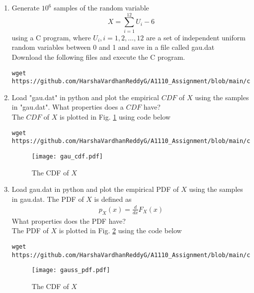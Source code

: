 \documentclass[journal,12pt,twocolumn]{IEEEtran}
\renewcommand\thesection{\arabic{section}}
\begin{document}
\begin{enumerate}[label=\thesection.\arabic*
,ref=\thesection.\theenumi]
\item
Generate $10^6$ samples of the random variable
%
\begin{equation}
X = \sum_{i=1}^{12}U_i -6
\end{equation}
%
using a C program, where $U_i, i = 1,2,\dots, 12$ are  a set of independent uniform random variables between 0 and 1
and save in a file called gau.dat\\
\solution Download the following files and execute the  C program.
\begin{lstlisting}
wget https://github.com/HarshaVardhanReddyG/A1110_Assignment/blob/main/codes/exrand_gaussian.c
\end{lstlisting}
\item Load "gau.dat" in python and plot the empirical $CDF$ of $X$ using the samples in "gau.dat". What properties does a $CDF$ have?\\
\solution
The $CDF$ of $X$ is plotted in Fig. \ref{fig:gauss_cdf} using code below
\begin{lstlisting}
wget https://github.com/HarshaVardhanReddyG/A1110_Assignment/blob/main/codes/cdf_gau_plot.py
\end{lstlisting}
\begin{figure}[ht!]
\centering
\texttt{[image: gau\_cdf.pdf]}
\caption{The CDF of $X$}
\centering
\label{fig:gauss_cdf}
\end{figure}

\item
Load gau.dat in python and plot the empirical PDF of $X$ using the samples in gau.dat. The PDF of $X$ is defined as
\begin{align}
p_{X}(x) = \frac{d}{dx}F_{X}(x)
\end{align}
What properties does the PDF have?
\\
\solution The PDF of $X$ is plotted in Fig. \ref{fig:gauss_pdf} using the code below
\begin{lstlisting}
wget https://github.com/HarshaVardhanReddyG/A1110_Assignment/blob/main/codes/pdf_gau_plot.py
\end{lstlisting}
\begin{figure}[ht!]
\centering
\texttt{[image: gauss\_pdf.pdf]}
\caption{The CDF of $X$}
\centering
\label{fig:gauss_pdf}
\end{figure}


\end{enumerate}
\end{document}
